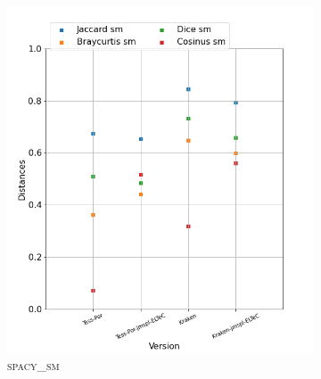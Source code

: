 \begin{figure}[H]
\begin{minipage}{6cm}
\begin{subfigure}{0.89\textwidth}
  \label{fig: }
  \end{subfigure}
  \end{minipage}
  \begin{minipage}{6cm}
  \begin{subfigure}{0.89\textwidth}
  \includegraphics[width=.89\textwidth]{IMAGES/ELTeC_DISTANCES_spaCy3.5.1/CASTRO-OSORIO-graph-dist-spaCy3.5.1-sm.png} 
  \caption{\textsc{spacy\_sm}}
  \label{fig:}
  \end{subfigure}
    \end{minipage}
  \begin{minipage}{6cm}
  \begin{subfigure}{0.89\textwidth}

\end{subfigure}
\end{minipage}
\end{figure}
